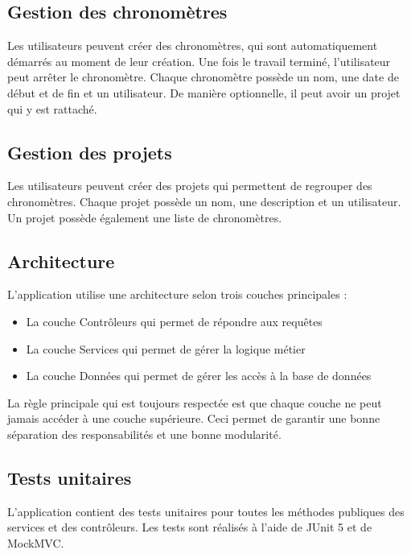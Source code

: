 \documentclass[
  french,
  a4paper,
]{scrartcl}
\begin{document}
\subsection{Gestion des chronomètres}

Les utilisateurs peuvent créer des chronomètres, qui sont automatiquement démarrés 
au moment de leur création. Une fois le travail terminé, l'utilisateur peut arrêter 
le chronomètre. 
Chaque chronomètre possède un nom, une date de début et de fin et un utilisateur. 
De manière optionnelle, il peut avoir un projet qui y est rattaché. 

\subsection{Gestion des projets}

Les utilisateurs peuvent créer des projets qui permettent de regrouper des chronomètres.
Chaque projet possède un nom, une description et un utilisateur. Un projet 
possède également une liste de chronomètres. 

\subsection{Architecture}

L'application utilise une architecture selon trois couches principales : 

\begin{itemize}
    \item La couche Contrôleurs qui permet de répondre aux requêtes
    \item La couche Services qui permet de gérer la logique métier
    \item La couche Données qui permet de gérer les accès à la base de données
\end{itemize}

La règle principale qui est toujours respectée est que chaque couche ne peut
jamais accéder à une couche supérieure. Ceci permet de garantir une bonne
séparation des responsabilités et une bonne modularité.

\subsection{Tests unitaires}

L'application contient des tests unitaires pour toutes les méthodes 
publiques des services et des contrôleurs. Les tests sont réalisés
à l'aide de JUnit 5 et de MockMVC. 
\end{document}
